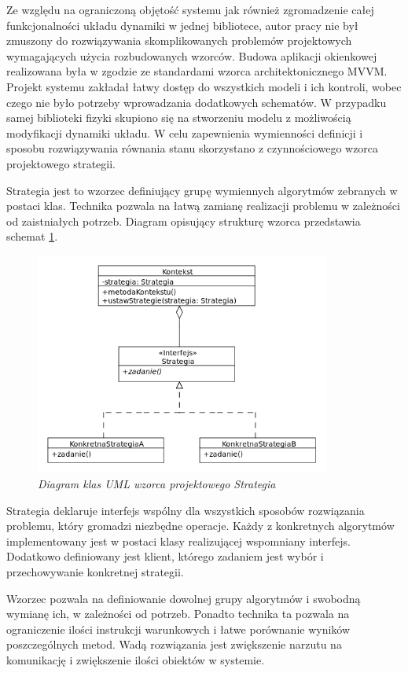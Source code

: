 \documentclass[12pt, twoside, openany]{report}
\theoremstyle{definition}
\begin{document}
Ze względu na ograniczoną objętość systemu jak również zgromadzenie całej funkcjonalności układu dynamiki w jednej bibliotece, autor pracy nie był zmuszony do rozwiązywania skomplikowanych problemów projektowych wymagających użycia rozbudowanych wzorców. Budowa aplikacji okienkowej realizowana była w zgodzie ze standardami wzorca architektonicznego MVVM. Projekt systemu zakładał łatwy dostęp do wszystkich modeli i ich kontroli, wobec czego nie było potrzeby wprowadzania dodatkowych schematów. W przypadku samej biblioteki fizyki skupiono się na stworzeniu modelu z możliwością modyfikacji dynamiki układu. W celu zapewnienia wymienności definicji i sposobu rozwiązywania równania stanu skorzystano z czynnościowego wzorca projektowego strategii.

Strategia jest to wzorzec definiujący grupę wymiennych algorytmów zebranych w postaci klas. Technika pozwala na łatwą zamianę realizacji problemu w zależności od zaistniałych potrzeb. Diagram opisujący strukturę wzorca przedstawia schemat \ref{StrategyPattern}.

\begin{figure}[H]
	\centering
		\includegraphics[width = 275pt]{StrategyPattern} 
		\caption{\textit{Diagram klas UML wzorca projektowego Strategia}}
		\label{StrategyPattern}
\end{figure}

Strategia deklaruje interfejs wspólny dla wszystkich sposobów rozwiązania problemu, który gromadzi niezbędne operacje. Każdy z konkretnych algorytmów implementowany jest w postaci klasy realizującej wspomniany interfejs. Dodatkowo definiowany jest klient, którego zadaniem jest wybór i przechowywanie konkretnej strategii. 

Wzorzec pozwala na definiowanie dowolnej grupy algorytmów i swobodną wymianę ich, w zależności od potrzeb. Ponadto technika ta pozwala na ograniczenie ilości instrukcji warunkowych i łatwe porównanie wyników poszczególnych metod. Wadą rozwiązania jest zwiększenie narzutu na komunikację i zwiększenie ilości obiektów w systemie.
\end{document}

